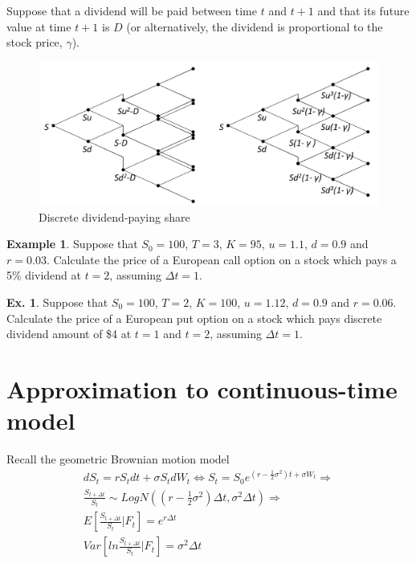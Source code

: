 \documentclass[11pt,a4paper]{book}
\theoremstyle{definition}\newtheorem{definition}{Definition}
\theoremstyle{definition}\newtheorem{fact}{Fact}
\theoremstyle{definition}\newtheorem{remark}{Remark}
\theoremstyle{definition}\newtheorem{ex}{Ex.}
\theoremstyle{definition}\newtheorem{project}{Project}
\theoremstyle{definition}\newtheorem{problem}{Problem}
\theoremstyle{definition}\newtheorem{example}{Example}
\numberwithin{theorem}{section}
\numberwithin{corollary}{chapter}
\numberwithin{assumption}{chapter}
\numberwithin{definition}{chapter}
\numberwithin{prop}{chapter}
\numberwithin{notation}{chapter}
\numberwithin{problem}{chapter}
\numberwithin{example}{chapter}
\numberwithin{fact}{chapter}
\numberwithin{ex}{chapter}
\begin{document}
Suppose that a dividend will be paid between time $t$ and $t+1$ and that its future value at time $t+1$ is $D$ (or alternatively, the dividend is proportional to the stock price, $\gamma$).

\begin{figure}[H]
	\centering
	\includegraphics[scale=0.5]{Chapter04/Chapter4_3.png}
	\caption{Discrete dividend-paying share}
\end{figure}

\begin{example}
Suppose that $S_0=100$, $T=3$, $K=95$, $u=1.1$, $d=0.9$ and $r=0.03$. Calculate the price of a European call option on a stock which pays a 5\% dividend at $t=2$, assuming $\Delta t = 1$.
\end{example}

\begin{ex}
Suppose that $S_0=100$, $T=2$, $K=100$, $u=1.12$, $d=0.9$ and $r=0.06$. Calculate the price of a European put option on a stock which pays discrete dividend amount of \$4 at $t=1$ and $t=2$, assuming $\Delta t = 1$.
\end{ex}

\section{Approximation to continuous-time model}

Recall the geometric Brownian motion model
\begin{align}
dS_t = rS_t dt + \sigma S_t dW_t \Longleftrightarrow S_t = S_0 e^{(r-\frac{1}{2}\sigma^2)t + \sigma W_t} \Longrightarrow \nonumber \\
\frac{S_{t+\Delta t}}{S_t} \sim LogN\left( \left(r-\frac{1}{2}\sigma^2 \right) \Delta t, \sigma^2 \Delta t \right) \Longrightarrow \nonumber \\
E\left[ \frac{S_{t+\Delta t}}{S_t} | F_t \right] = e^{r \Delta t} \nonumber \\
Var\left[ ln \frac{S_{t+\Delta t}}{S_t} | F_t \right] = \sigma^2 \Delta t
\end{align}
\end{document}
